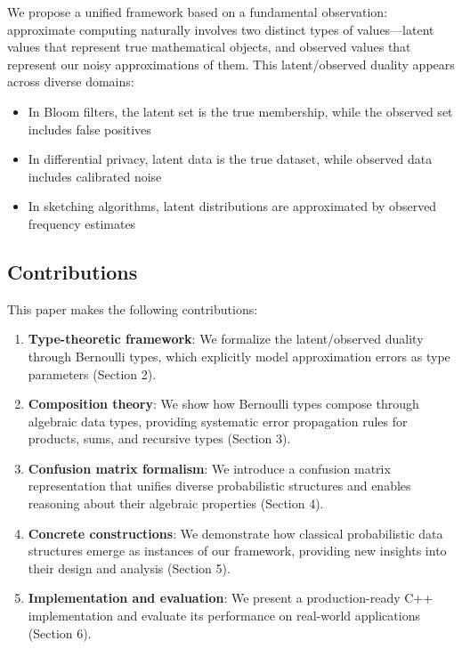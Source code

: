 \documentclass[11pt]{article}
\begin{document}
We propose a unified framework based on a fundamental observation: approximate computing naturally involves two distinct types of values—latent values that represent true mathematical objects, and observed values that represent our noisy approximations of them. This latent/observed duality appears across diverse domains:
\begin{itemize}
\item In Bloom filters, the latent set is the true membership, while the observed set includes false positives
\item In differential privacy, latent data is the true dataset, while observed data includes calibrated noise
\item In sketching algorithms, latent distributions are approximated by observed frequency estimates
\end{itemize}

\subsection{Contributions}

This paper makes the following contributions:

\begin{enumerate}
\item \textbf{Type-theoretic framework}: We formalize the latent/observed duality through Bernoulli types, which explicitly model approximation errors as type parameters (Section 2).

\item \textbf{Composition theory}: We show how Bernoulli types compose through algebraic data types, providing systematic error propagation rules for products, sums, and recursive types (Section 3).

\item \textbf{Confusion matrix formalism}: We introduce a confusion matrix representation that unifies diverse probabilistic structures and enables reasoning about their algebraic properties (Section 4).

\item \textbf{Concrete constructions}: We demonstrate how classical probabilistic data structures emerge as instances of our framework, providing new insights into their design and analysis (Section 5).

\item \textbf{Implementation and evaluation}: We present a production-ready C++ implementation and evaluate its performance on real-world applications (Section 6).
\end{enumerate}
\end{document}
